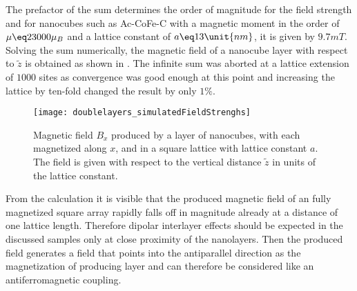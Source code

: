 \documentclass[\main/dresen_thesis.tex]{subfiles}
\begin{document}
  The prefactor of the sum determines the order of magnitude for the field strength and for nanocubes such as Ac-CoFe-C with a magnetic moment in the order of $\mu \eq 23000 \mu_B$ and a lattice constant of $a \eq 13 \unit{nm}$, it is given by $9.7 \unit{mT}$.
  Solving the sum numerically, the magnetic field of a nanocube layer with respect to $\tilde{z}$ is obtained as shown in .
  The infinite sum was aborted at a lattice extension of $1000$ sites as convergence was good enough at this point and increasing the lattice by ten-fold changed the result by only $1\%$.

  \begin{figure}[tb]
    \centering
    \texttt{[image: doublelayers\_simulatedFieldStrenghs]}
    \caption{\label{fig:doubleLayers:layerMagneticField}Magnetic field $B_x$ produced by a layer of nanocubes, with each magnetized along $x$, and in a square lattice with lattice constant $a$. The field is given with respect to the vertical distance $\tilde{z}$ in units of the lattice constant.}
  \end{figure}                                                    

  From the calculation it is visible that the produced magnetic field of an fully magnetized square array rapidly falls off in magnitude already at a distance of one lattice length.
  Therefore dipolar interlayer effects should be expected in the discussed samples only at close proximity of the nanolayers.
  Then the produced field generates a field that points into the antiparallel direction as the magnetization of producing layer and can therefore be considered like an antiferromagnetic coupling.
\end{document}
